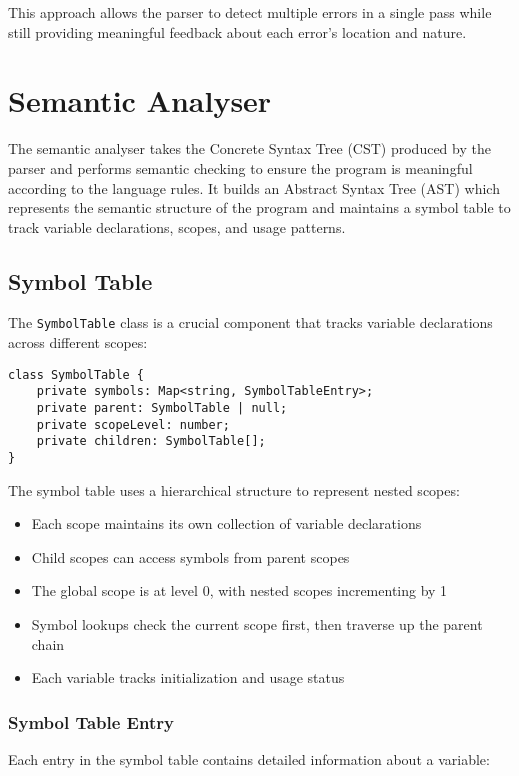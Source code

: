 \documentclass[12pt]{article}
\begin{document}
This approach allows the parser to detect multiple errors in a single pass while still providing meaningful feedback about each error's location and nature.

\section{Semantic Analyser}

The semantic analyser takes the Concrete Syntax Tree (CST) produced by the parser and performs semantic checking to ensure the program is meaningful according to the language rules. It builds an Abstract Syntax Tree (AST) which represents the semantic structure of the program and maintains a symbol table to track variable declarations, scopes, and usage patterns.

\subsection{Symbol Table}
The \texttt{SymbolTable} class is a crucial component that tracks variable declarations across different scopes:

\begin{lstlisting}
class SymbolTable {
    private symbols: Map<string, SymbolTableEntry>;
    private parent: SymbolTable | null;
    private scopeLevel: number;
    private children: SymbolTable[];
}
\end{lstlisting}

The symbol table uses a hierarchical structure to represent nested scopes:

\begin{itemize}
    \item Each scope maintains its own collection of variable declarations
    \item Child scopes can access symbols from parent scopes
    \item The global scope is at level 0, with nested scopes incrementing by 1
    \item Symbol lookups check the current scope first, then traverse up the parent chain
    \item Each variable tracks initialization and usage status
\end{itemize}

\subsubsection{Symbol Table Entry}
Each entry in the symbol table contains detailed information about a variable:
\end{document}
